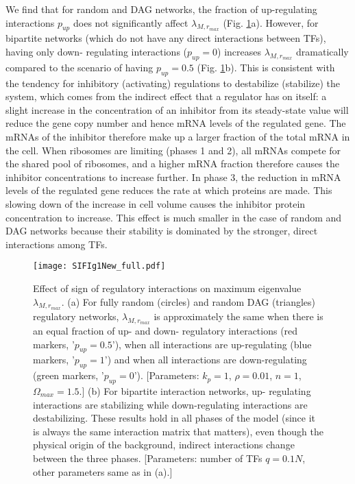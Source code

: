 \documentclass[10pt]{article}
\begin{document}
We find that for random and DAG networks, the fraction of up-regulating interactions $p_{up}$ does not significantly affect $\lambda_{M,r_{max}}$ (Fig. \ref{SIfig:EffectofIntSign}a). However, for bipartite networks (which do not have any direct interactions between TFs), having only down- regulating interactions ($p_{up} = 0$) increases $\lambda_{M,r_{max}}$ dramatically compared to the scenario of having $p_{up} = 0.5$ (Fig. \ref{SIfig:EffectofIntSign}b). This is consistent with the tendency for inhibitory (activating) regulations to destabilize (stabilize) the system, which comes from the indirect effect that a regulator has on itself: a slight increase in the concentration of an inhibitor from its steady-state value will reduce the gene copy number and hence mRNA levels of the regulated gene. The mRNAs of the inhibitor therefore make up a larger fraction of the total mRNA in the cell. When ribosomes are limiting (phases 1 and 2), all mRNAs compete for the shared pool of ribosomes, and a higher mRNA fraction therefore causes the inhibitor concentrations to increase further. In phase 3, the reduction in mRNA levels of the regulated gene reduces the rate at which proteins are made. This slowing down of the increase in cell volume causes the inhibitor protein concentration to increase. This effect is much smaller in the case of random and DAG networks because their stability is dominated by the stronger, direct interactions among TFs.  


\begin{figure}[!htb]
    \centering
	\texttt{[image: SIFIg1New\_full.pdf]}
    \caption{Effect of sign of regulatory interactions on maximum eigenvalue $\lambda_{M,r_{max}}$. (a) For fully random (circles) and random DAG (triangles) regulatory networks, $\lambda_{M,r_{max}}$ is approximately the same when there is an equal fraction of up- and down- regulatory interactions (red markers, '$p_{up} = 0.5$'), when all interactions are up-regulating (blue markers, '$p_{up} = 1$') and when all interactions are down-regulating (green markers, '$p_{up} = 0$'). [Parameters: $k_p = 1$, $\rho = 0.01$, $n = 1$, $\Omega_{max} = 1.5$.] (b) For bipartite interaction networks, up- regulating interactions are stabilizing while down-regulating interactions are destabilizing. These results hold in all phases of the model (since it is always the same interaction matrix that matters), even though the physical origin of the background, indirect interactions change between the three phases. [Parameters: number of TFs $q = 0.1N$, other parameters same as in (a).] }
    \label{SIfig:EffectofIntSign}
\end{figure}
\end{document}
